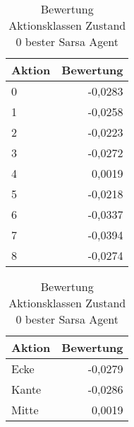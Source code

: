 \begin{table}[!htb]
    \begin{minipage}[t]{.49\textwidth}
        \centering
        \label{tab:state0_eval_sarsa}
        \caption{Bewertung Zustand 0 \\ bester Sarsa Agent}
        \begin{tabular}{lr}
        \toprule
        Aktion  & Bewertung \\ \midrule
        0	& -0,0283 \\
        1	& -0,0258 \\
        2	& -0,0223 \\
        3	& -0,0272 \\
        4	& 0,0019  \\
        5	& -0,0218 \\
        6	& -0,0337 \\
        7	& -0,0394 \\
        8	& -0,0274 \\ \bottomrule
        
        \end{tabular}
    \end{minipage}%
    \begin{minipage}[t]{.49\textwidth}
        \centering
        \caption{Bewertung Aktionsklassen Zustand 0 bester Sarsa Agent}
        \label{tab:state0_eval_sarsa_aggregated}
        \begin{tabular}{lr}
        \toprule
        Aktion  & Bewertung \\ \midrule
        Ecke	& -0,0279 \\
        Kante	& -0,0286 \\
        Mitte	&  0,0019 \\ \bottomrule
        
        \end{tabular}
    \end{minipage}
\end{table}